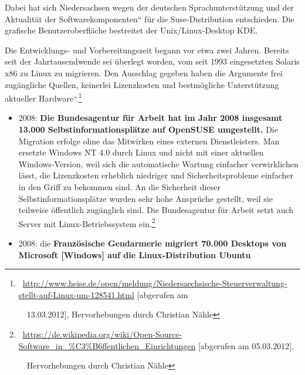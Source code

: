\documentclass[a4paper]{article}
\newcommand\textstyleInternetlink[1]{\foreignlanguage{english}{\textcolor[rgb]{0.0,0.0,0.5019608}{#1}}}
\newcommand\liststyleWWviiiNumiii{%
\renewcommand\theenumi{\arabic{enumi}}
\renewcommand\theenumii{\arabic{enumii}}
\renewcommand\theenumiii{\arabic{enumiii}}
\renewcommand\labelitemi{{}-}
\renewcommand\labelenumi{\theenumi.}
\renewcommand\labelenumii{\theenumii.}
\renewcommand\labelenumiii{\theenumiii.}
}
\begin{document}
{
Dabei hat sich Niedersachsen wegen der deutschen Sprachunterst\"utzung
und der {\quotedblbase}Aktualit\"at der
Softwarekomponenten{\textquotedblleft} f\"ur die Suse-Distribution
entschieden. Die grafische Benutzeroberfl\"ache bestreitet der
Unix/Linux-Desktop KDE.}

{
Die Entwicklungs- und Vorbereitungszeit begann vor etwa zwei Jahren.
Bereits seit der Jahrtausendwende sei \"uberlegt worden, vom seit 1993
eingesetzten Solaris x86 zu Linux zu migrieren. Den Ausschlag gegeben
haben die Argumente {\quotedblbase}frei zug\"angliche Quellen,
keinerlei Lizenzkosten und bestm\"ogliche Unterst\"utzung aktueller
Hardware{\textquotedblleft}.{\guillemotleft}\footnote{\ \url{http://www.heise.de/open/meldung/Niedersaechsische-Steuerverwaltung-stellt-auf-Linux-um-128541.html}
[abgerufen am\par \ \ 13.03.2012], Hervorhebungen durch Christian
N\"ahle}}


\bigskip

\liststyleWWviiiNumiii
\begin{itemize}
\item {
2008: {\guillemotright}\textbf{Die Bundesagentur f\"ur Arbeit hat im
Jahr 2008 insgesamt 13.000 Selbstinformationspl\"atze auf OpenSUSE
umgestellt.} Die Migration erfolge ohne das Mitwirken eines externen
Dienstleisters. Man ersetzte Windows NT 4.0 durch Linux und nicht mit
einer aktuellen Windows-Version, weil sich die automatische Wartung
einfacher verwirklichen l\"asst, die Lizenzkosten erheblich niedriger
und Sicherheitsprobleme einfacher in den Griff zu bekommen sind. An die
Sicherheit dieser Selbstinformationspl\"atze wurden sehr hohe
Anspr\"uche gestellt, weil sie teilweise \"offentlich zug\"anglich
sind. Die Bundesagentur f\"ur Arbeit setzt auch Server mit
Linux-Betriebssystem
ein.{\guillemotleft}\footnote{\ \href{https://de.wikipedia.org/wiki/Open-Source-Software_in_?ffentlichen_Einrichtungen}{\textstyleInternetlink{https://de.wikipedia.org/wiki/Open-Source-Software\_in\_\%C3\%B6ffentlichen\_Einrichtungen}}
[abgerufen am 05.03.2012],\par \ \ Hervorhebungen durch Christian
N\"ahle}}
\end{itemize}

\bigskip

\liststyleWWviiiNumiii
\begin{itemize}
\item {
{\guillemotright}2008: die \textbf{Franz\"osische Gendarmerie migriert
70.000 Desktops von Microsoft [Windows] auf die Linux-Distribution
Ubuntu}}
\end{itemize}
\end{document}
